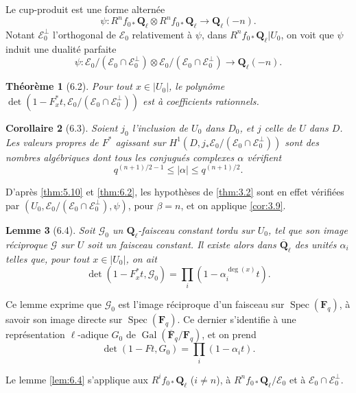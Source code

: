 \documentclass[12pt,a4paper]{amsart}
\theoremstyle{plain}
\newtheorem{theoreme}{Th\'eor\`eme}[section]
\newtheorem{lemme}[theoreme]{Lemme}
\newtheorem{corollaire}[theoreme]{Corollaire}
\theoremstyle{definition}
\theoremstyle{remark}
\DeclareMathOperator{\Gal}{Gal}
\DeclareMathOperator{\Spec}{Spec}
\newcommand{\Q}{\mathbf{Q}}
\newcommand{\F}{\mathbf{F}}
\numberwithin{equation}{section}
\begin{document}
Le cup-produit est une forme altern\'ee
\[
\psi : R^n f_{0\ast}\Q_\ell \otimes R^n f_{0\ast}\Q_\ell \longrightarrow \Q_\ell(-n).
\]
Notant $\mathscr{E}_0^\perp$ l'orthogonal de $\mathscr{E}_0$ relativement \`a $\psi$, dans $R^n f_{0\ast}\Q_\ell|U_0$, on voit que $\psi$ induit une dualit\'e parfaite
\[
\psi : \mathscr{E}_0/(\mathscr{E}_0\cap\mathscr{E}_0^\perp) \otimes \mathscr{E}_0/(\mathscr{E}_0\cap\mathscr{E}_0^\perp) \longrightarrow \Q_\ell(-n).
\]

\begin{theoreme}[6.2]\label{thm:6.2}
Pour tout $x\in|U_0|$, le polyn\^ome $\det(1-F_x^\ast t, \mathscr{E}_0/(\mathscr{E}_0\cap\mathscr{E}_0^\perp))$ est \`a coefficients rationnels.
\end{theoreme}

\begin{corollaire}[6.3]\label{cor:6.3}
Soient $j_0$ l'inclusion de $U_0$ dans $D_0$, et $j$ celle de $U$ dans $D$. Les valeurs propres de $F^*$ agissant sur $H^1(D,j_\ast\mathscr{E}_0/(\mathscr{E}_0\cap\mathscr{E}_0^\perp))$ sont des nombres alg\'ebriques dont tous les conjugu\'es complexes $\alpha$ v\'erifient
\[
q^{(n+1)/2-1} \le |\alpha| \le q^{(n+1)/2}.
\]
\end{corollaire}

D'apr\`es \eqref{thm:5.10} et \eqref{thm:6.2}, les hypoth\`eses de \eqref{thm:3.2} sont en effet v\'erifi\'ees par $(U_0, \mathscr{E}_0/(\mathscr{E}_0\cap\mathscr{E}_0^\perp), \psi)$, pour $\beta=n$, et on applique \eqref{cor:3.9}.

\begin{lemme}[6.4]\label{lem:6.4}
Soit $\mathscr{G}_0$ un $\Q_\ell$-faisceau constant tordu sur $U_0$, tel que son image r\'eciproque $\mathscr{G}$ sur $U$ soit un faisceau constant. Il existe alors dans $\overline{\Q}_\ell$ des unit\'es $\alpha_i$ telles que, pour tout $x\in|U_0|$, on ait
\[
\det(1-F_x^\ast t, \mathscr{G}_0) = \prod_i (1-\alpha_i^{\deg(x)} t).
\]
\end{lemme}

Ce lemme exprime que $\mathscr{G}_0$ est l'image r\'eciproque d'un faisceau sur $\Spec(\F_q)$, \`a savoir son image directe sur $\Spec(\F_q)$. Ce dernier s'identifie \`a une repr\'esentation $\ell$-adique $G_0$ de $\Gal(\overline{\F}_q/\F_q)$, et on prend
\[
\det(1-Ft, G_0) = \prod_i (1-\alpha_i t).
\]

Le lemme \eqref{lem:6.4} s'applique aux $R^i f_{0\ast}\Q_\ell$ ($i\not=n$), \`a $R^n f_{0\ast}\Q_\ell/\mathscr{E}_0$ et \`a $\mathscr{E}_0\cap\mathscr{E}_0^\perp$.
\end{document}
